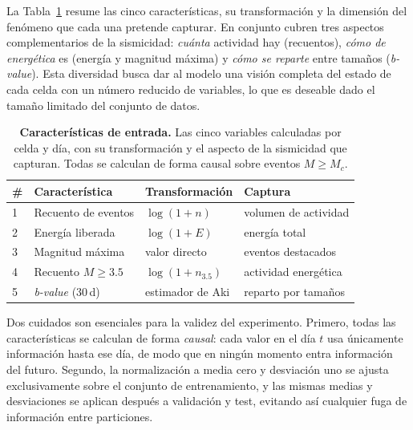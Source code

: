 La Tabla~\ref{tab:features} resume las cinco características, su transformación y la dimensión
del fenómeno que cada una pretende capturar. En conjunto cubren tres aspectos complementarios
de la sismicidad: \emph{cuánta} actividad hay (recuentos), \emph{cómo de energética} es
(energía y magnitud máxima) y \emph{cómo se reparte} entre tamaños (\textit{b-value}). Esta
diversidad busca dar al modelo una visión completa del estado de cada celda con un número
reducido de variables, lo que es deseable dado el tamaño limitado del conjunto de datos.

\begin{table}[ht!]
  \centering
  \small
  \begin{tabular}{@{}llll@{}}
    \toprule
    \textbf{\#} & \textbf{Característica}  & \textbf{Transformación} & \textbf{Captura}     \\
    \midrule
    1           & Recuento de eventos      & $\log(1+n)$             & volumen de actividad \\
    2           & Energía liberada         & $\log(1+E)$             & energía total        \\
    3           & Magnitud máxima          & valor directo           & eventos destacados   \\
    4           & Recuento $M\geq 3.5$     & $\log(1+n_{3.5})$       & actividad energética \\
    5           & \textit{b-value} (30\,d) & estimador de Aki        & reparto por tamaños  \\
    \bottomrule
  \end{tabular}
  \caption[Características de entrada de los modelos de pronóstico]{\textbf{Características de entrada.} Las cinco variables calculadas por celda y día, con su transformación y el aspecto de la sismicidad que capturan. Todas se calculan de forma causal sobre eventos $M\geq M_c$.}
  \label{tab:features}
\end{table}

Dos cuidados son esenciales para la validez del experimento. Primero, todas las
características se calculan de forma \emph{causal}: cada valor en el día \(t\) usa únicamente
información hasta ese día, de modo que en ningún momento entra información del futuro.
Segundo, la normalización a media cero y desviación uno se ajusta exclusivamente sobre el
conjunto de entrenamiento, y las mismas medias y desviaciones se aplican después a
validación y test, evitando así cualquier fuga de información entre particiones.

